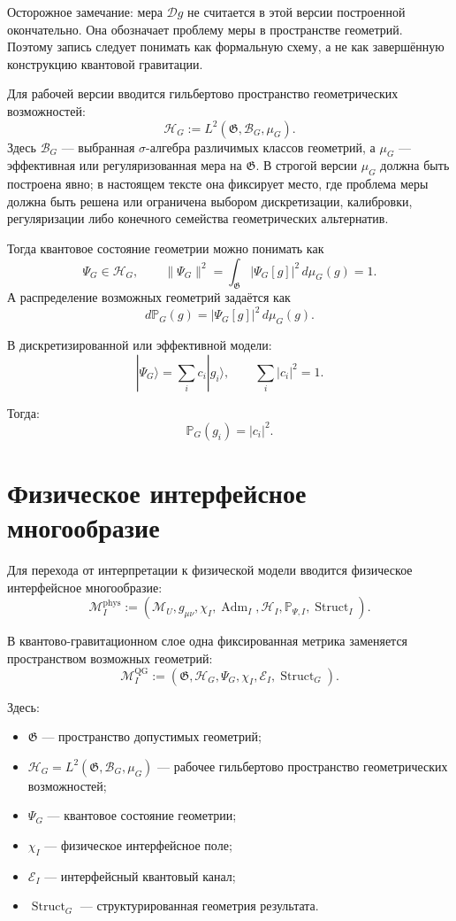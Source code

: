 \documentclass[12pt,a4paper]{article}
\DeclareMathOperator{\Adm}{Adm}
\DeclareMathOperator{\Struct}{Struct}
\newcommand{\M}{\mathcal M_U}
\newcommand{\MIphys}{\mathcal M_I^{\mathrm{phys}}}
\newcommand{\MIQG}{\mathcal M_I^{\mathrm{QG}}}
\newcommand{\Gspace}{\mathfrak G}
\newcommand{\Hilb}{\mathcal H}
\newcommand{\Prob}{\mathbb P}
\newcommand{\D}{\mathcal D}
\newcommand{\BorelG}{\mathcal B_G}
\begin{document}
Осторожное замечание: мера $\D g$ не считается в этой версии построенной окончательно. Она обозначает проблему меры в пространстве геометрий. Поэтому запись следует понимать как формальную схему, а не как завершённую конструкцию квантовой гравитации.

Для рабочей версии вводится гильбертово пространство геометрических возможностей:
\[
\boxed{
\Hilb_G
:=
L^2(\Gspace,\BorelG,\mu_G).
}
\]
Здесь $\BorelG$ --- выбранная $\sigma$-алгебра различимых классов геометрий, а $\mu_G$ --- эффективная или регуляризованная мера на $\Gspace$. В строгой версии $\mu_G$ должна быть построена явно; в настоящем тексте она фиксирует место, где проблема меры должна быть решена или ограничена выбором дискретизации, калибровки, регуляризации либо конечного семейства геометрических альтернатив.

Тогда квантовое состояние геометрии можно понимать как
\[
\Psi_G\in\Hilb_G,
\qquad
\|\Psi_G\|^2
=
\int_{\Gspace}|\Psi_G[g]|^2\,d\mu_G(g)=1.
\]
А распределение возможных геометрий задаётся как
\[
\boxed{
d\Prob_G(g)=|\Psi_G[g]|^2\,d\mu_G(g).
}
\]

В дискретизированной или эффективной модели:
\[
\boxed{
|\Psi_G\rangle
=
\sum_i c_i |g_i\rangle,
\qquad
\sum_i |c_i|^2=1.
}
\]

Тогда:
\[
\boxed{
\Prob_G(g_i)=|c_i|^2.
}
\]

\section{Физическое интерфейсное многообразие}

Для перехода от интерпретации к физической модели вводится физическое интерфейсное многообразие:
\[
\boxed{
\MIphys
:=
(\M,g_{\mu\nu},\chi_I,\Adm_I,\Hilb_I,\Prob_{\Psi,I},\Struct_I).
}
\]

В квантово-гравитационном слое одна фиксированная метрика заменяется пространством возможных геометрий:
\[
\boxed{
\MIQG
:=
(\Gspace,\Hilb_G,\Psi_G,\chi_I,\mathcal E_I,\Struct_G).
}
\]

Здесь:
\begin{itemize}[leftmargin=2em]
    \item $\Gspace$ --- пространство допустимых геометрий;
    \item $\Hilb_G=L^2(\Gspace,\BorelG,\mu_G)$ --- рабочее гильбертово пространство геометрических возможностей;
    \item $\Psi_G$ --- квантовое состояние геометрии;
    \item $\chi_I$ --- физическое интерфейсное поле;
    \item $\mathcal E_I$ --- интерфейсный квантовый канал;
    \item $\Struct_G$ --- структурированная геометрия результата.
\end{itemize}
\end{document}
